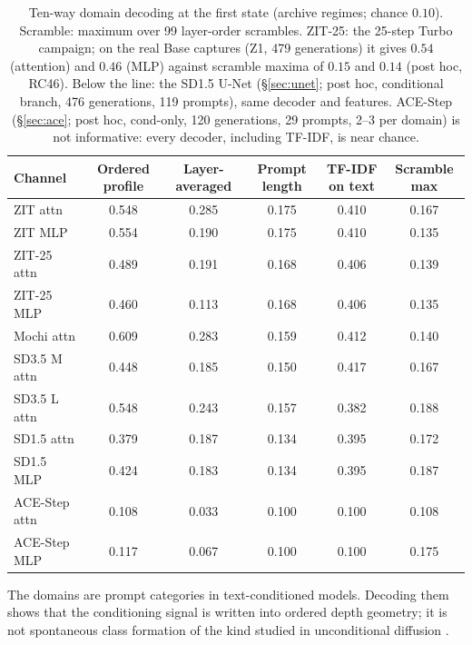 \documentclass[11pt]{article}
\newcommand{\TT}{ZIT-25}%
\begin{document}
\begin{table}[htbp]
\centering\small
\caption{Ten-way domain decoding at the first state (archive regimes; chance $0.10$). Scramble: maximum over 99 layer-order scrambles. \TT{}: the 25-step Turbo campaign; on the real Base captures (Z1, 479 generations) it gives $0.54$ (attention) and $0.46$ (MLP) against scramble maxima of $0.15$ and $0.14$ (post hoc, RC46). Below the line: the SD1.5 U-Net (\S\ref{sec:unet}; post hoc, conditional branch, 476 generations, 119 prompts), same decoder and features. ACE-Step (\S\ref{sec:ace}; post hoc, cond-only, 120 generations, 29 prompts, 2--3 per domain) is not informative: every decoder, including TF-IDF, is near chance.}
\label{tab:decode}
\begin{tabular}{lccccc}
\toprule
Channel & Ordered profile & Layer-averaged & Prompt length & TF-IDF on text & Scramble max\\
\midrule
ZIT attn & 0.548 & 0.285 & 0.175 & 0.410 & 0.167\\
ZIT MLP & 0.554 & 0.190 & 0.175 & 0.410 & 0.135\\
\TT{} attn & 0.489 & 0.191 & 0.168 & 0.406 & 0.139\\
\TT{} MLP & 0.460 & 0.113 & 0.168 & 0.406 & 0.135\\
Mochi attn & 0.609 & 0.283 & 0.159 & 0.412 & 0.140\\
SD3.5 M attn & 0.448 & 0.185 & 0.150 & 0.417 & 0.167\\
SD3.5 L attn & 0.548 & 0.243 & 0.157 & 0.382 & 0.188\\
\midrule
SD1.5 attn & 0.379 & 0.187 & 0.134 & 0.395 & 0.172\\
SD1.5 MLP & 0.424 & 0.183 & 0.134 & 0.395 & 0.187\\
ACE-Step attn & 0.108 & 0.033 & 0.100 & 0.100 & 0.108\\
ACE-Step MLP & 0.117 & 0.067 & 0.100 & 0.100 & 0.175\\
\bottomrule
\end{tabular}
\end{table}

The domains are prompt categories in text-conditioned models. Decoding them shows that the conditioning signal is written into ordered depth geometry; it is not spontaneous class formation of the kind studied in unconditional diffusion \citep{biroli2024dynamical,sclocchi2025phase}.
\end{document}
